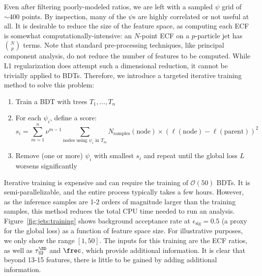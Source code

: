 Even after filtering poorly-modeled ratios, we are left with a sampled $\psi$ grid of $\sim 400$ points.
By inspection, many of the $\psi$s are highly correlated or not useful at all.
It is desirable to reduce the size of the feature space, as computing each ECF is somewhat computationally-intensive: an $N$-point ECF on a $p$-particle jet has $\binom{N}{p}$ terms. 
Note that standard pre-processing techniques, like principal component analysis, do not reduce the number of features to be computed. 
While L1 regularization does attempt such a dimensional reduction, it cannot be trivially applied to BDTs. 
Therefore, we introduce a targeted iterative training method to solve this problem:
\begin{enumerate}
    \item Train a BDT with trees $T_1,\dots,T_n$
    \item For each $\psi_i$, define a score:
        \begin{equation}
             s_i = \sum_{m=1}^n \nu^{m-1} \sum_{\text{nodes using $\psi_i$ in $T_m$}} N_\text{samples}(\mathrm{node}) \times \left(\ell(\mathrm{node}) - \ell(\mathrm{parent})\right)^2  
        \end{equation}
    \item Remove (one or more) $\psi_i$ with smallest $s_i$ and repeat until the global loss $L$ worsens significantly
\end{enumerate}
Iterative training is expensive and can require the training of $\mathcal{O}(50)$ BDTs.
It is semi-parallelizable, and the entire process typically takes a few hours.
However, as the inference samples are 1-2 orders of magnitude larger than the training samples, this method reduces the total CPU time needed to run an analysis. 
Figure~\ref{fig:jets:training} shows background acceptance rate at $\epsilon_\mathrm{sig}=0.5$ (a proxy for the global loss) as a function of feature space size. 
For illustrative purposes, we only show the range $[1,50]$.
The inputs for this training are the ECF ratios, as well as $\tau_{32}^\SD$ and $\frec$, which provide additional information.
It is clear that beyond 13-15 features, there is little to be gained by adding additional information.


